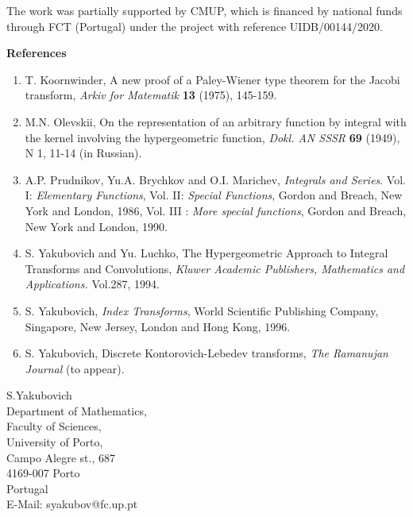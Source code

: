 \documentclass[twoside,12pt]{article}
\begin{document}
\noindent The work was partially supported by CMUP, which is financed by national funds through FCT (Portugal)  under the project with reference UIDB/00144/2020.   





\bigskip
\centerline{{\bf References}}
\bigskip
\baselineskip=12pt
\medskip
\begin{enumerate}


\item[{\bf 1.}\ ]  T. Koornwinder, A new proof of a Paley-Wiener type theorem for the Jacobi transform,   {\it Arkiv for Matematik} {\bf 13} (1975),  145-159.

\item[{\bf 2.}\ ]  M.N. Olevskii, On the representation of an arbitrary function by integral with the kernel involving the hypergeometric function,   {\it Dokl. AN SSSR} {\bf 69} (1949), N 1, 11-14 (in Russian). 

\item[{\bf 3.}\ ] A.P. Prudnikov, Yu.A. Brychkov and O.I. Marichev, {\it Integrals and Series}. Vol. I: {\it Elementary
Functions}, Vol. II: {\it Special Functions}, Gordon and Breach, New York and London, 1986, Vol. III : {\it More special functions},  Gordon and Breach, New York and London,  1990.

\item[{\bf 4.}\ ]  S. Yakubovich and Yu. Luchko, The Hypergeometric Approach to Integral Transforms and Convolutions, {\it Kluwer
Academic Publishers, Mathematics and Applications.} Vol.287, 1994. 


\item[{\bf 5.}\ ] S. Yakubovich, {\it Index Transforms}, World Scientific Publishing Company, Singapore, New Jersey, London and
Hong Kong, 1996.

\item[{\bf 6.}\ ]  S. Yakubovich, Discrete Kontorovich-Lebedev transforms, {\it The Ramanujan Journal} (to appear).




\end{enumerate}

\vspace{5mm}

\noindent S.Yakubovich\\
Department of  Mathematics,\\
Faculty of Sciences,\\
University of Porto,\\
Campo Alegre st., 687\\
4169-007 Porto\\
Portugal\\
E-Mail: syakubov@fc.up.pt\\
\end{document}
